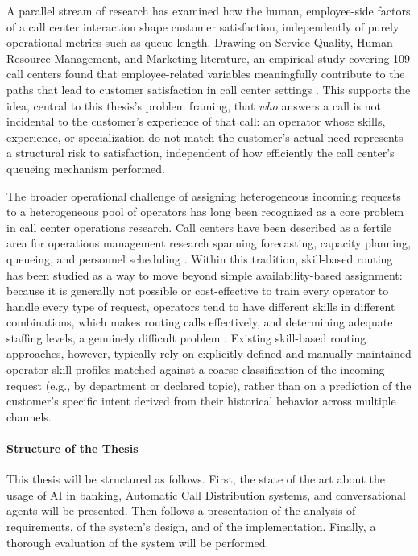 \documentclass[12pt,a4paper,openright,twoside]{book}
\begin{document}
A parallel stream of research has examined how the human, employee-side factors of a call center interaction shape customer satisfaction,
independently of purely operational metrics such as queue length. Drawing on Service Quality, Human Resource Management, and Marketing literature,
an empirical study covering 109 call centers found that employee-related variables meaningfully contribute to the paths that lead to customer satisfaction in call center settings \cite{chicu2019exploring}.
This supports the idea, central to this thesis's problem framing, that \emph{who} answers a call is not incidental to the customer's experience of that call:
an operator whose skills, experience, or specialization do not match the customer's actual need represents a structural risk to satisfaction,
independent of how efficiently the call center's queueing mechanism performed.

The broader operational challenge of assigning heterogeneous incoming requests to a heterogeneous pool of operators has long been recognized as a core problem
in call center operations research. Call centers have been described as a fertile area for operations management research spanning forecasting, capacity planning,
queueing, and personnel scheduling \cite{aksin2007modern}. Within this tradition, skill-based routing has been studied as a way to move beyond simple
availability-based assignment: because it is generally not possible or cost-effective to train every operator to handle every type of request,
operators tend to have different skills in different combinations, which makes routing calls effectively, and determining adequate staffing levels,
a genuinely difficult problem \cite{wallace2005staffing}. Existing skill-based routing approaches, however, typically rely on explicitly defined and
manually maintained operator skill profiles matched against a coarse classification of the incoming request (e.g., by department or declared topic),
rather than on a prediction of the customer's specific intent derived from their historical behavior across multiple channels.


\paragraph{Structure of the Thesis}
This thesis will be structured as follows. First, the state of the art about the usage of AI in banking, Automatic Call Distribution systems, and conversational agents will be presented. Then follows a presentation of the analysis of requirements, of the system's design, and of the implementation. Finally, a thorough evaluation of the system will be performed.
\end{document}
